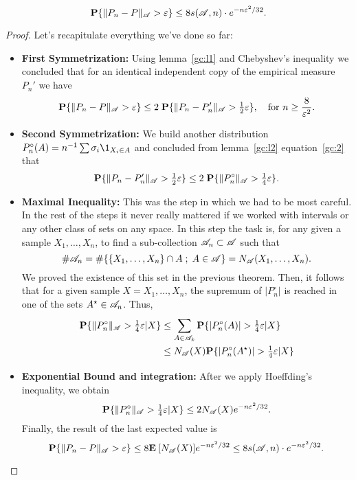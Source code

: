 \begin{theorem}\label{vc:inequality}
 \[\P\{\|P_n-P\|_{\AA} > \varepsilon\} \leq 8 s(\AA, n) \cdot e^{-n \varepsilon^2 / 32}. \] 
\end{theorem}
\begin{proof}
    Let's recapitulate everything we've done so far:
    \begin{itemize}
        \item \textbf{First Symmetrization:} Using {lemma}~\ref{gc:l1} and Chebyshev's inequality we concluded that for an identical independent copy of the empirical measure $P_n'$ we have
        \[ \P\{\|P_n - P\|_\AA > \varepsilon\} \leq 2 \; \P\{\|P_n-P_n'\|_\AA > \tfrac{1}{2}\varepsilon\},\hspace*{1em}\text{for } n \geq \frac{8}{\varepsilon^2}.\] 
        \item \textbf{Second Symmetrization:} We build another distribution $P_n^\circ(A) = n^{-1}\sum \sigma_i \1_{X_i \in A} $ and concluded from {lemma}~\ref{gc:l2} equation~\ref{gc:2} that
        \[ \P\{\|P_n-P_n'\|_\AA > \tfrac{1}{2}\varepsilon\} \leq 2\; \P\{\|P_n^\circ\|_\AA > \tfrac{1}{4}\varepsilon\}.   \]
        \item \textbf{Maximal Inequality:} This was the step in which we had to be most careful. In the rest of the steps it never really mattered if we worked with intervals or any other class of sets on any space. In this step the task is, for any given a sample $X_1, \ldots, X_n$, to find a sub-collection $\AA_n \subset \AA$ such that
        \[ \#\AA_n = \#\{\{X_1,\ldots,X_n\}\cap A \; ;\; A\in\AA\} = N_\AA(X_1,\ldots, X_n).\] 
        We proved the existence of this set in the previous theorem. Then, it follows that for a given sample $X = X_1,\ldots, X_n$, the supremum of $|P_n^\circ|$ is reached in one of the sets $A^\star \in \AA_n$. Thus,
        \[ \everymath{\displaystyle}\arraycolsep=1.4pt\def\arraystretch{1.5}
        \begin{array}{rcl}
            \P\{\|P_n^\circ\|_\AA > \tfrac{1}{4}\varepsilon | X\} & \leq & \sum_{A\in \AA_k}\P\{|P_n^\circ(A)| > \tfrac{1}{4}\varepsilon | X\} \\
            &\leq& N_\AA(X) \P\{|P_n^\circ(A^\star)| > \tfrac{1}{4}\varepsilon | X\}
       \end{array}
        \]
        \item \textbf{Exponential Bound and integration:} After we apply Hoeffding's inequality, we obtain
        \[ \P\{\|P_n^\circ\|_\AA > \tfrac{1}{4}\varepsilon | X\} \leq 2 N_\AA(X) e^{-n\varepsilon^2/32}.\]
        Finally, the result of the last expected value is 
         \[ \P\{\|P_n-P\|_\AA > \varepsilon\} \leq 8 \E[N_\AA(X)] e^{-n\varepsilon^2/32} \leq 8 s(\AA, n) \cdot e^{-n \varepsilon^2 / 32}. \] 
    \end{itemize}
\end{proof}

